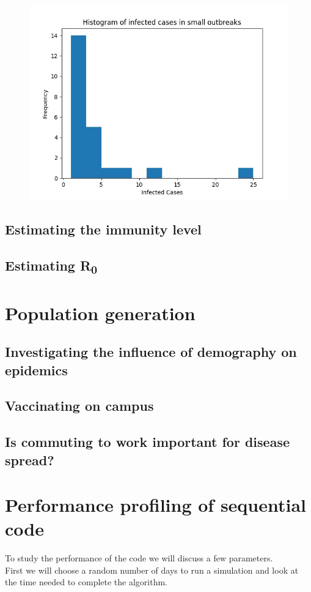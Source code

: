 \documentclass[runningheads]{llncs}
\begin{document}
\begin{figure}
	\includegraphics[width=\textwidth]{extinction_small.jpg}	
	\label{fig4}
\end{figure}


\subsection{Estimating the immunity level}
\subsection{Estimating R\textsubscript{0}}

\section{Population generation}
\subsection{Investigating the influence of demography on epidemics}
\subsection{Vaccinating on campus}
\subsection{Is commuting to work important for disease spread?}

\section{Performance profiling of sequential code}
To study the performance of the code we will discuss a few parameters.
\\
First we will choose a random number of days to run a simulation and look at the time needed to complete the algorithm.
\end{document}
